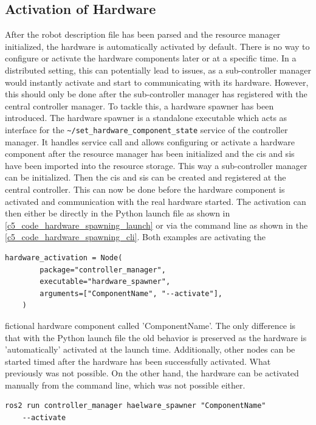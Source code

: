 \subsection{Activation of Hardware}
After the robot description file has been parsed and the resource manager initialized, the hardware is automatically activated by default. There is no way to configure or activate the hardware components later or  at a specific time. In a distributed setting, this can potentially lead to issues, as a sub-controller manager would instantly activate and start to communicating with its hardware. However, this should only be done after the sub-controller manager has registered with the central controller manager.\newline
To tackle this, a hardware spawner has been introduced. The hardware spawner is a standalone executable which acts as interface for the \lstset{language=C++,basicstyle=\small\ttfamily}\lstinline{~/set_hardware_component_state} service of the controller manager. It \glspl{handle} service call and allows configuring or activate a hardware component after the resource manager has been initialized and the \glspl{ci} and \glspl{si} have been imported into the resource storage. This way a sub-controller manager can be initialized. Then the \glspl{ci} and \glspl{si} can be created and registered at the central controller. This can now be done before the hardware component is activated and communication with the real hardware started.\newline
The activation can then either be directly in the Python launch file as shown in \autoref{c5_code_hardware_spawning_launch} or via the command line as shown in the \autoref{c5_code_hardware_spawning_cli}. Both examples are activating the
\lstset{language=Python,basicstyle=\small}
\begin{lstlisting}[caption=Example of using the hardware spawner in a python launch file.,label=c5_code_hardware_spawning_launch]
    hardware_activation = Node(
        package="controller_manager",
        executable="hardware_spawner",
        arguments=["ComponentName", "--activate"],
    )
\end{lstlisting}
fictional hardware component called 'ComponentName'. The only difference is that with the Python launch file the old behavior is preserved as the hardware is 'automatically' activated at the launch time. Additionally, other nodes can be started timed after the hardware has been successfully activated. What previously was not possible. On the other hand, the hardware can be activated manually from the command line, which was not possible either.
\begin{lstlisting}[caption=Example of using the hardware spawner from command line., label=c5_code_hardware_spawning_cli]
ros2 run controller_manager haelware_spawner "ComponentName" 
    --activate
\end{lstlisting}

